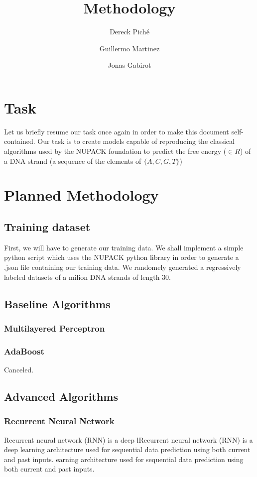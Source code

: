 \documentclass{article}
\title{Methodology}
\author
{
    Dereck Piché \and
    Guillermo Martinez \and
    Jonas Gabirot \and
}
\begin{document}
\maketitle

\section{Task}
Let us briefly resume our task once again in order to make this document
self-contained. Our task is to create models capable of reproducing 
the classical algorithms used by the NUPACK foundation to predict the 
free energy ($\in R$) of a DNA strand (a sequence of the elements of $\{A,C,G,T\}$)

\section{Planned Methodology}
\subsection{Training dataset}
First, we will have to generate our training data. We shall implement a 
simple python script which uses the NUPACK python library in order
to generate a .json file containing our training data. We randomely 
generated a regressively labeled datasets of a milion DNA strands of length $30$.
\subsection{Baseline Algorithms}

\subsubsection{Multilayered Perceptron}

\subsubsection{AdaBoost}
Canceled.

\subsection{Advanced Algorithms}

\subsubsection{Recurrent Neural Network}
Recurrent neural network (RNN) is a deep lRecurrent neural network 
(RNN) is a deep learning architecture used for sequential data prediction
using both current and past inputs. earning architecture used for sequential 
data prediction using both current and past inputs. 
\end{document}
